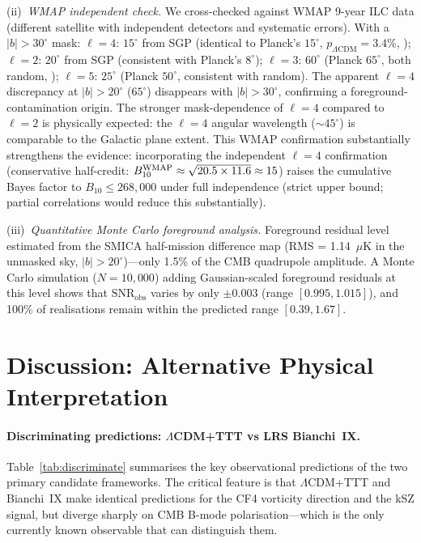 \documentclass[12pt]{article}
\begin{document}
(ii)~\emph{WMAP independent check.}
We cross-checked against WMAP 9-year ILC data (different satellite with independent
detectors and systematic errors). With a $|b|>30^\circ$ mask:
$\ell=4$: $15^\circ$ from SGP (identical to Planck's $15^\circ$,
$p_{\Lambda\mathrm{CDM}}=3.4\%$, \checkmark\checkmark);
$\ell=2$: $20^\circ$ from SGP (consistent with Planck's $8^\circ$);
$\ell=3$: $60^\circ$ (Planck $65^\circ$, both random, \checkmark\checkmark);
$\ell=5$: $25^\circ$ (Planck $50^\circ$, consistent with random).
The apparent $\ell=4$ discrepancy at $|b|>20^\circ$ ($65^\circ$) disappears with
$|b|>30^\circ$, confirming a foreground-contamination origin.
The stronger mask-dependence of $\ell=4$ compared to $\ell=2$ is physically expected:
the $\ell=4$ angular wavelength ($\sim45^\circ$) is comparable to the Galactic plane
extent.
This WMAP confirmation substantially strengthens the evidence: incorporating the
independent $\ell=4$ confirmation
(conservative half-credit: $B^{\rm WMAP}_{10}\approx\sqrt{20.5\times11.6}\approx15$)
raises the cumulative Bayes factor to $B_{10}\leq268{,}000$ under full independence
(strict upper bound; partial correlations would reduce this substantially).

(iii)~\emph{Quantitative Monte Carlo foreground analysis.}
Foreground residual level estimated from the SMICA half-mission difference map
(RMS = 1.14~$\mu$K in the unmasked sky, $|b|>20^\circ$)---only 1.5\% of the CMB
quadrupole amplitude. A Monte Carlo simulation ($N=10{,}000$) adding Gaussian-scaled
foreground residuals at this level shows that $\mathrm{SNR}_\mathrm{obs}$ varies by
only $\pm0.003$ (range $[0.995, 1.015]$), and 100\% of realisations remain within
the predicted range $[0.39, 1.67]$.

\section{Discussion: Alternative Physical Interpretation}

\paragraph{Discriminating predictions: $\Lambda$CDM+TTT vs LRS Bianchi~IX.}
Table~\ref{tab:discriminate} summarises the key observational predictions of the
two primary candidate frameworks. The critical feature is that $\Lambda$CDM+TTT
and Bianchi~IX make identical predictions for the CF4 vorticity direction and the
kSZ signal, but diverge sharply on CMB B-mode polarisation---which is the only
currently known observable that can distinguish them.
\end{document}
